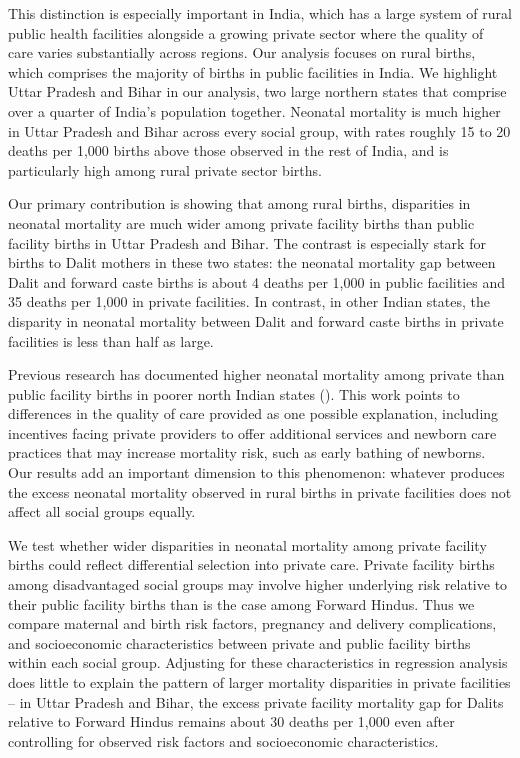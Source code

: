 \documentclass[12pt]{article}
\begin{document}
This distinction is especially important in India, which has a large system of rural public health facilities alongside a growing private sector where the quality of care varies substantially across regions. Our analysis focuses on rural births, which comprises the majority of births in public facilities in India. We highlight Uttar Pradesh and Bihar in our analysis, two large northern states that comprise over a quarter of India's population together. Neonatal mortality is much higher in Uttar Pradesh and Bihar across every social group, with rates roughly 15 to 20 deaths per 1,000 births above those observed in the rest of India, and is particularly high among rural private sector births. 

Our primary contribution is showing that among rural births, disparities in neonatal mortality are much wider among private facility births than public facility births in Uttar Pradesh and Bihar. The contrast is especially stark for births to Dalit mothers in these two states: the neonatal mortality gap between Dalit and forward caste births is about 4 deaths per 1,000 in public facilities and 35 deaths per 1,000 in private facilities. In contrast, in other Indian states, the disparity in neonatal mortality between Dalit and forward caste births in private facilities is less than half as large.

Previous research has documented higher neonatal mortality among private than public facility births in poorer north Indian states (\cite{franz2025cheaper, coffey2025excess}). This work points to differences in the quality of care provided as one possible explanation, including incentives facing private providers to offer additional services and newborn care practices that may increase mortality risk, such as early bathing of newborns. Our results add an important dimension to this phenomenon: whatever produces the excess neonatal mortality observed in rural births in private facilities does not affect all social groups equally.

We test whether wider disparities in neonatal mortality among private facility births could reflect differential selection into private care. Private facility births among disadvantaged social groups may involve higher underlying risk relative to their public facility births than is the case among Forward Hindus. Thus we compare maternal and birth risk factors, pregnancy and delivery complications, and socioeconomic characteristics between private and public facility births within each social group. Adjusting for these characteristics in regression analysis does little to explain the pattern of larger mortality disparities in private facilities -- in Uttar Pradesh and Bihar, the excess private facility mortality gap for Dalits relative to Forward Hindus remains about 30 deaths per 1,000 even after controlling for observed risk factors and socioeconomic characteristics.
\end{document}
